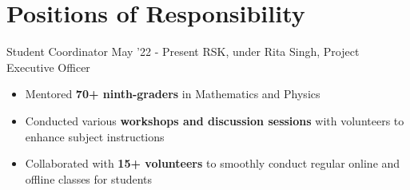 \section*{\sc Positions of Responsibility}
\vspace{-2mm}
\hrulefill
\vspace{1mm}

\excventry
{Student Coordinator}
{May '22 - Present}
{RSK, under Rita Singh, Project Executive Officer}
{
  \begin{itemize}
    \item Mentored \textbf{70+ ninth-graders} in Mathematics and Physics
    \item Conducted various \textbf{workshops and discussion sessions} with volunteers to enhance subject instructions
    \item Collaborated with \textbf{15+ volunteers} to smoothly conduct regular online and offline classes for students
  \end{itemize}
}
\vspace{-2mm}